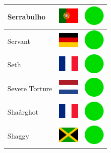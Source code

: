\documentclass[12pt, a4paper, twoside]{report}
\begin{document}
\begin{center}
\begin{longtable}{|p{5cm}|p{2cm}|p{2cm}|}
 Serrabulho                                                 & \includegraphics[width=1cm]{../4x3/pt} &   \includegraphics[width=1cm]{../likes/y} \\ \hline
 Servant                                                    & \includegraphics[width=1cm]{../4x3/de} &   \includegraphics[width=1cm]{../likes/y} \\ \hline
 Seth                                                       & \includegraphics[width=1cm]{../4x3/fr} &   \includegraphics[width=1cm]{../likes/y} \\ \hline
 Severe Torture                                             & \includegraphics[width=1cm]{../4x3/nl} &   \includegraphics[width=1cm]{../likes/y} \\ \hline
 Shaârghot                                                  & \includegraphics[width=1cm]{../4x3/fr} &   \includegraphics[width=1cm]{../likes/y} \\ \hline
 Shaggy                                                     & \includegraphics[width=1cm]{../4x3/jm} &   \includegraphics[width=1cm]{../likes/y} \\ \hline

\end{longtable}
\end{center}
\end{document}

